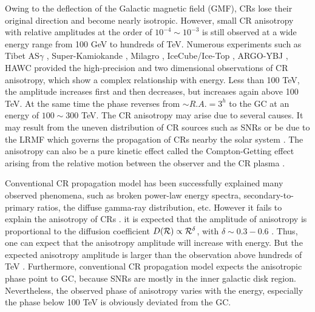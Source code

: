 \documentclass[a4paper,11pt]{article}
\begin{document}
Owing to the deflection of the Galactic magnetic field (GMF), CRs lose their original direction and become nearly isotropic.
However, small CR anisotropy with relative amplitudes at the order of $10^{-4} \sim 10^{-3}$ is still observed  at a wide energy range from 100 GeV to hundreds of TeV.
Numerous experiments such as Tibet AS$\gamma$   
\citep{2006Sci...314..439A,  Amenomori:2010yr,  Amenomori:2017jbv},
Super-Kamiokande \citep{
	2007PhRvD..75f2003G}, Milagro \citep{ 2008PhRvL.101v1101A, 2009ApJ...698.2121A}, IceCube/Ice-Top \citep{ 2010ApJ...718L.194A,
	2011ApJ...740...16A, 2012ApJ...746...33A, 2013ApJ...765...55A, 2016ApJ...826..220A}, ARGO-YBJ \citep{2013PhRvD..88h2001B, 2015ApJ...809...90B}, HAWC \citep{2014ApJ...796..108A}
provided the high-precision and two dimensional observations of CR anisotropy,
which show a complex relationship with energy.
Less than 100 TeV, the amplitude increases  first and then decreases, but increases again above 100 TeV. At the same time the phase reverses from $\sim R.A.= 3^h$ to the GC at an energy of $100 \sim 300 $ TeV.
The CR anisotropy may arise due to several causes. 
It may result from the uneven distribution of CR sources such as SNRs \citep{2006APh....25..183E, 2012JCAP...01..010B}
or be due to the LRMF which governs the propagation of CRs nearby the solar system \citep {2014Sci...343..988S, 2015PhRvL.114b1101M, 2016PhRvL.117o1103A}. 
The anisotropy can also be a pure kinetic effect called the Compton-Getting effect arising from the relative motion between the observer and the CR plasma \citep{1935PhRv...47..817C,1968Ap&SS...2..431G}.


Conventional CR propagation model  has been successfully explained
many observed phenomena, such as broken power-law energy spectra, secondary-to-primary ratios, the diffuse gamma-ray distribution, etc.
However it fails to  explain  the anisotropy of CRs \citep{2012JCAP...01..011B,       2017PhRvD..96b3006L}. 
it is expected 
that the amplitude of anisotropy is proportional to the diffusion coefficient $D({\cal R}) \propto {\cal R}^\delta$, with $\delta \sim 0.3 - 0.6$ .
Thus, one can expect that the anisotropy amplitude will increase with energy.
But the expected anisotropy amplitude is larger than the observation  above hundreds of TeV \citep{2012JCAP...01..011B}. 
Furthermore, conventional CR propagation model expects the anisotropic phase point to GC, because SNRs are mostly in the inner galactic disk region. Nevertheless, the observed  phase of anisotropy varies with the energy, especially the phase below 100 TeV is obviously deviated from the GC. 
\end{document}
